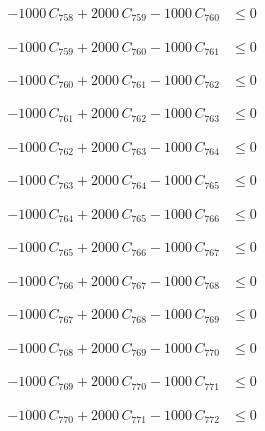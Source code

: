 \documentclass[a4paper,11pt]{article}
\begin{document}
\begin{align}
-1000\,C_{758} + 2000\,C_{759} - 1000\,C_{760} &\leq 0 \nonumber
\end{align}

\begin{align}
-1000\,C_{759} + 2000\,C_{760} - 1000\,C_{761} &\leq 0 \nonumber
\end{align}

\begin{align}
-1000\,C_{760} + 2000\,C_{761} - 1000\,C_{762} &\leq 0 \nonumber
\end{align}

\begin{align}
-1000\,C_{761} + 2000\,C_{762} - 1000\,C_{763} &\leq 0 \nonumber
\end{align}

\begin{align}
-1000\,C_{762} + 2000\,C_{763} - 1000\,C_{764} &\leq 0 \nonumber
\end{align}

\begin{align}
-1000\,C_{763} + 2000\,C_{764} - 1000\,C_{765} &\leq 0 \nonumber
\end{align}

\begin{align}
-1000\,C_{764} + 2000\,C_{765} - 1000\,C_{766} &\leq 0 \nonumber
\end{align}

\begin{align}
-1000\,C_{765} + 2000\,C_{766} - 1000\,C_{767} &\leq 0 \nonumber
\end{align}

\begin{align}
-1000\,C_{766} + 2000\,C_{767} - 1000\,C_{768} &\leq 0 \nonumber
\end{align}

\begin{align}
-1000\,C_{767} + 2000\,C_{768} - 1000\,C_{769} &\leq 0 \nonumber
\end{align}

\begin{align}
-1000\,C_{768} + 2000\,C_{769} - 1000\,C_{770} &\leq 0 \nonumber
\end{align}

\begin{align}
-1000\,C_{769} + 2000\,C_{770} - 1000\,C_{771} &\leq 0 \nonumber
\end{align}

\begin{align}
-1000\,C_{770} + 2000\,C_{771} - 1000\,C_{772} &\leq 0 \nonumber
\end{align}
\end{document}
